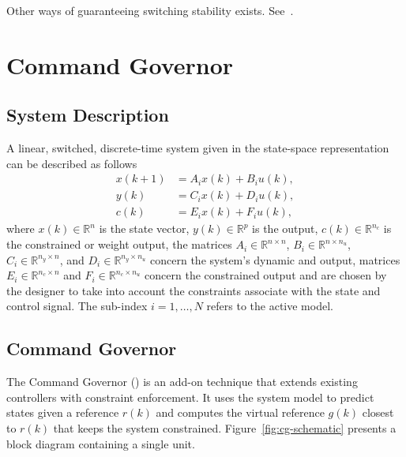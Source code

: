 Other ways of guaranteeing switching stability exists.
See~\textcite{geromel.deaecto:stability,liberzon.morse:basic,geromel.colaneri:stabilization}.

\section{Command Governor}%
\label{sec:command-governor}

\subsection{System Description}%
\label{subsec:system-description}

A linear, switched, discrete-time system given in the state-space representation
can be described as follows
%
\begin{equation}
  \label{eq:state-space}
  \begin{aligned}
    x(k+1) & = A_{i}x(k)+B_{i}u(k), \\
    y(k)   & = C_{i}x(k)+D_{i}u(k), \\
    c(k)   & = E_{i}x(k)+F_{i}u(k),
  \end{aligned}
\end{equation}
%
where \(x(k)\in\mathbb{R}^n\) is the state vector, \(y(k)\in\mathbb{R}^p\) is the
output, \(c(k)\in\mathbb{R}^{n_c}\) is the constrained or weight output, the
matrices \(A_{i}\in\mathbb{R}^{n\times{}n}\), \(B_{i}\in\mathbb{R}^{n\times{}n_u}\),
\(C_{i}\in\mathbb{R}^{n_y\times{}n}\), and \(D_{i}\in\mathbb{R}^{n_y\times{}n_u}\) concern the
system's dynamic and output, matrices \(E_{i}\in\mathbb{R}^{n_c\times{}n}\) and
\(F_{i}\in\mathbb{R}^{n_c\times{}n_u}\) concern the constrained output and are chosen
by the designer to take into account the constraints associate with the state
and control signal. The sub-index \(i = 1,\ldots,N\) refers to the active model.

\subsection{Command Governor}%
\label{subsec:cg}

The Command Governor (\CG{}) is an add-on technique that extends existing
controllers with constraint enforcement. It uses the system model to predict
states given a reference \(r(k)\) and computes the virtual reference \(g(k)\)
closest to \(r(k)\) that keeps the system constrained.
Figure~\ref{fig:cg-schematic} presents a block diagram containing a single \CG{}
unit.

